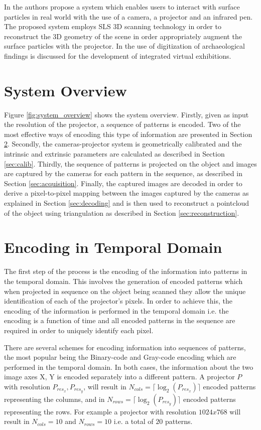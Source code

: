 \documentclass[final,12pt,3p]{elsarticle}
\begin{document}
In \cite{jones2010build} the authors propose a system which enables users to interact with surface particles in real world with the use of a camera, a projector and an infrared pen. The proposed system employs SLS 3D scanning technology in order to reconstruct the 3D geometry of the scene in order appropriately augment the surface particles with the projector. In \cite{bruno20103d} the use of digitization of archaeological findings is discussed for the development of integrated virtual exhibitions. 




\section{System Overview}
\label{sec:system_overview}
Figure \ref{fig:system_overview} shows the system overview. Firstly, given as input the resolution of the projector, a sequence of patterns is encoded. Two of the most effective ways of encoding this type of information are presented in Section \ref{sec:encoding_of_patterns}. Secondly, the cameras-projector system is geometrically calibrated and the intrinsic and extrinsic parameters are calculated as described in Section \ref{sec:calib}. Thirdly, the sequence of patterns is projected on the object and images are captured by the cameras for each pattern in the sequence, as described in Section \ref{sec:acquisition}. Finally, the captured images are decoded in order to derive a pixel-to-pixel mapping between the images captured by the cameras as explained in Section \ref{sec:decoding} and is then used to reconstruct a pointcloud of the object using triangulation as described in Section \ref{sec:reconstruction}.

\section{Encoding in Temporal Domain}
\label{sec:encoding_of_patterns}
The first step of the process is the encoding of the information into patterns in the temporal domain. This involves the generation of encoded patterns which when projected in sequence on the object being scanned they allow the unique identification of each of the projector's pixels. In order to achieve this, the encoding of the information is performed in the temporal domain i.e. the encoding is a function of time and all encoded patterns in the sequence are required in order to uniquely identify each pixel.

There are several schemes for encoding information into sequences of patterns, the most popular being the Binary-code and Gray-code encoding which are performed in the temporal domain. In both cases, the information about the two image axes X, Y is encoded separately into a different pattern. A projector $P$ with resolution $P_{res_x}, P_{res_y}$, will result in $N_{cols} = \lceil \log_2 (P_{res_x})  \rceil$ encoded patterns representing the columns, and in $N_{rows} = \lceil \log_2 (P_{res_y}) \rceil$ encoded patterns representing the rows. For example a projector with resolution $1024x768$ will result in $N_{cols} = 10$ and $N_{rows} = 10$ i.e. a total of $20$ patterns.
\end{document}
